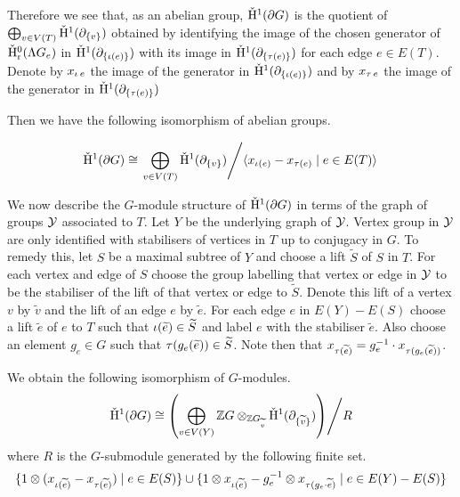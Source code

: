 Therefore we see that, as an abelian group, $\check{\mathrm{H}}{}^1(\partial G)$ is the quotient of $\bigoplus_{v \in V(T)}\check{\mathrm{H}}{}^1(\partial_{\{v\}})$ obtained by identifying the image of the chosen generator of $\check{\mathrm{H}}{}^0_{\mathrm{r}}(\Lambda G_e)$ in $\check{\mathrm{H}}{}^1(\partial_{\{\operatorname{\iota}(e)\}})$ with its image in $\check{\mathrm{H}}{}^1(\partial_{\{\operatorname{\tau}(e)\}})$ for each edge $e \in E(T)$.
Denote by $x_{\operatorname{\iota} e}$ the image of the generator in $\check{\mathrm{H}}{}^1(\partial_{\{\operatorname{\iota}(e)\}})$ and by $x_{\operatorname{\tau} e}$ the image of the generator in $\check{\mathrm{H}}{}^1(\partial_{\{\operatorname{\tau}(e)\}})$

Then we have the following isomorphism of abelian groups.

\begin{align}
  \check{\mathrm{H}}{}^1(\partial G) \cong \left.\bigoplus_{v \in V(T)} \check{\mathrm{H}}{}^1(\partial_{\{v\}}) \middle/ \langle x_{\operatorname{\iota}(e)} - x_{\operatorname{\tau}(e)} \mid e \in E(T)\rangle\right.
\end{align}

We now describe the $G$-module structure of $\check{\mathrm{H}}{}^1(\partial G)$ in terms of the graph of groups $\mathcal{Y}$ associated to $T$.
Let $Y$ be the underlying graph of $\mathcal{Y}$.
Vertex group in $\mathcal{Y}$ are only identified with stabilisers of vertices in $T$ up to conjugacy in $G$.
To remedy this, let $S$ be a maximal subtree of $Y$ and choose a lift $\widetilde{S}$ of $S$ in $T$.
For each vertex and edge of $S$ choose the group labelling that vertex or edge in $\mathcal{Y}$ to be the stabiliser of the lift of that vertex or edge to $\widetilde{S}$.
Denote this lift of a vertex $v$ by $\widetilde{v}$ and the lift of an edge $e$ by $\widetilde{e}$.
For each edge $e$ in $E(Y) - E(S)$ choose a lift $\widetilde{e}$ of $e$ to $T$ such that $\operatorname{\iota}(\widetilde{e}) \in \widetilde{S}$ and label $e$ with the stabiliser $\widetilde{e}$.
Also choose an element $g_e \in G$ such that $\operatorname{\tau}(g_e(\widetilde{e})) \in \widetilde{S}$.
Note then that $x_{\operatorname{\tau}(\widetilde{e})} = g_e^{-1}\cdot x_{\operatorname{\tau}(g_e(\widetilde{e}))}$.

We obtain the following isomorphism of $G$-modules.
\begin{align}
  \left.\check{\mathrm{H}}{}^1(\partial G) \cong \left(\bigoplus_{v \in V(Y)} \mathbb{Z} G \otimes_{\mathbb{Z} G_{\widetilde{v}}} \check{\mathrm{H}}{}^1(\partial_{\{\widetilde{v}\}})\right) \middle/ R\right.
\end{align}
where $R$ is the $G$-submodule generated by the following finite set.
\begin{align}
  \{1 \otimes (x_{\operatorname{\iota}(\widetilde{e})} - x_{\operatorname{\tau}(\widetilde{e})}) \mid e \in E(S)\} \cup \{1 \otimes x_{\operatorname{\iota}(\widetilde{e})} - g_e^{-1} \otimes x_{\operatorname{\tau}(g_e\cdot \widetilde{e})}\mid e \in E(Y) - E(S)\}
\end{align}

